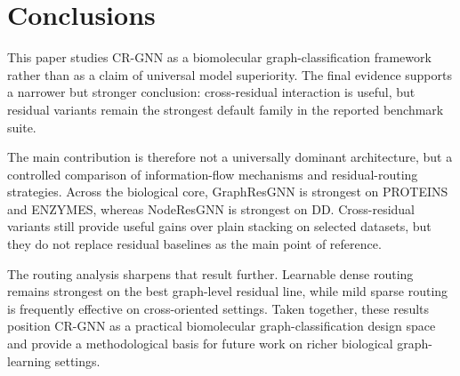 \section*{Conclusions}
\label{sec:conclusion}

This paper studies CR-GNN as a biomolecular graph-classification framework rather than as a claim of universal model superiority. The final evidence supports a narrower but stronger conclusion: cross-residual interaction is useful, but residual variants remain the strongest default family in the reported benchmark suite.

The main contribution is therefore not a universally dominant architecture, but a controlled comparison of information-flow mechanisms and residual-routing strategies. Across the biological core, GraphResGNN is strongest on PROTEINS and ENZYMES, whereas NodeResGNN is strongest on DD. Cross-residual variants still provide useful gains over plain stacking on selected datasets, but they do not replace residual baselines as the main point of reference.

The routing analysis sharpens that result further. Learnable dense routing remains strongest on the best graph-level residual line, while mild sparse routing is frequently effective on cross-oriented settings. Taken together, these results position CR-GNN as a practical biomolecular graph-classification design space and provide a methodological basis for future work on richer biological graph-learning settings.
